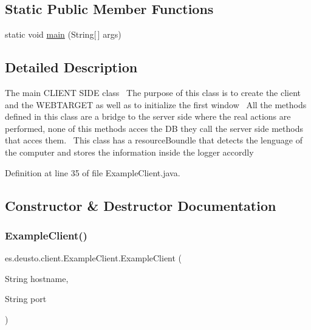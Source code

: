\subsection*{Static Public Member Functions}
\begin{DoxyCompactItemize}
\item 
static void \hyperlink{classes_1_1deusto_1_1client_1_1_example_client_a9eadbc017db92b83cad1f6b72c10bae2}{main} (String\mbox{[}$\,$\mbox{]} args)
\end{DoxyCompactItemize}


\subsection{Detailed Description}
The main C\+L\+I\+E\+NT S\+I\+DE class~\newline
The purpose of this class is to create the client and the W\+E\+B\+T\+A\+R\+G\+ET as well as to initialize the first window~\newline
All the methods defined in this class are a bridge to the server side where the real actions are performed, none of this methods acces the DB they call the server side methods that acces them.~\newline
This class has a resource\+Boundle that detects the lenguage of the computer and stores the information inside the logger accordly 

Definition at line 35 of file Example\+Client.\+java.



\subsection{Constructor \& Destructor Documentation}
\mbox{\label{classes_1_1deusto_1_1client_1_1_example_client_afe4bf9d0ff661de1e0ba936df0ce807f}} 
\subsubsection{\texorpdfstring{Example\+Client()}{ExampleClient()}}
{\footnotesize\ttfamily es.\+deusto.\+client.\+Example\+Client.\+Example\+Client (\begin{DoxyParamCaption}\item[{String}]{hostname,  }\item[{String}]{port }\end{DoxyParamCaption})}

